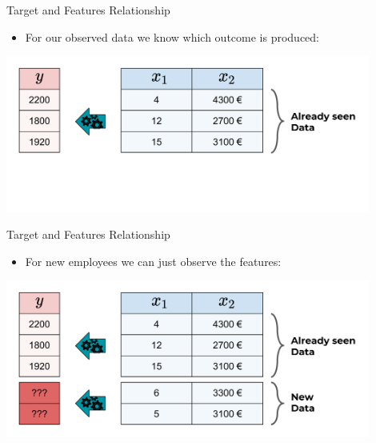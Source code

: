 \begin{frame}{Target and Features Relationship}

\begin{itemize}

\item
  For our observed data we know which outcome is produced:
\end{itemize}

\vspace{-0.5cm}

\scriptsize

\begin{center}\includegraphics[width=0.9\textwidth]{plots/new_data0_web} \end{center}

\normalsize 

\end{frame}

\begin{frame}{Target and Features Relationship}

\begin{itemize}

\item
  For new employees we can just observe the features:
\end{itemize}

\vspace{-0.5cm}

\scriptsize

\begin{center}\includegraphics[width=0.9\textwidth]{plots/new_data1_web} \end{center}

\normalsize 

\vspace{-0.5cm}
\end{frame}


